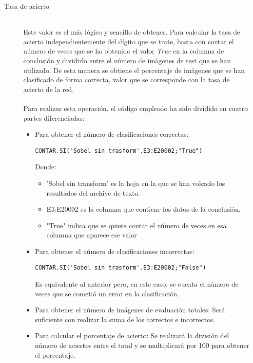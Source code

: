 \begin{description}
	\item[Tasa de acierto] \hfill 
	\vspace{5pt}
	\\
	Este valor es el más lógico y sencillo de obtener. Para calcular la tasa de acierto independientemente del dígito que se trate, basta con contar el número de veces que se ha obtenido el valor \textit{True} en la columna de conclusión y dividirlo entre el número de imágenes de test que se han utilizado. De esta manera se obtiene el porcentaje de imágenes que se han clasificado de forma correcta, valor que se corresponde con la tasa de acierto de la red.\\
	\vspace{-10pt}
	\\
	Para realizar esta operación, el código empleado ha sido dividido en cuatro partes diferenciadas:\\
	\vspace{-20pt}
	\begin{itemize}
		\item{Para obtener el número de clasificaciones correctas:
		\vspace{10pt}
		\begin{lstlisting}[frame=single]
	CONTAR.SI('Sobel sin trasform'.E3:E20002;"True")
		\end{lstlisting}
		Donde:
		\begin{itemize}
			\item 'Sobel sin transform' es la hoja en la que se han volcado los resultados del archivo de texto.
			\item E3:E20002 es la columna que contiene los datos de la conclusión.
			\item "True" indica que se quiere contar el número de veces en esa columna que aparece ese valor
		\end{itemize}
	}
	\item{Para obtener el número de clasificaciones incorrectas:
		\vspace{10pt}
		\begin{lstlisting}[frame=single]
	CONTAR.SI('Sobel sin trasform'.E3:E20002;"False")
		\end{lstlisting}
		Es equivalente al anterior pero, en este caso, se cuenta el número de veces que se cometió un error en la clasificación.
	}
	\item{Para obtener el número de imágenes de evaluación totales: Será suficiente con realizar la suma de los correctos e incorrectos.
	}
	\item{Para calcular el porcentaje de acierto: Se realizará la división del número de aciertos entre el total y se multiplicará por 100 para obtener el porcentaje.
}
\end{itemize}
\end{description}

